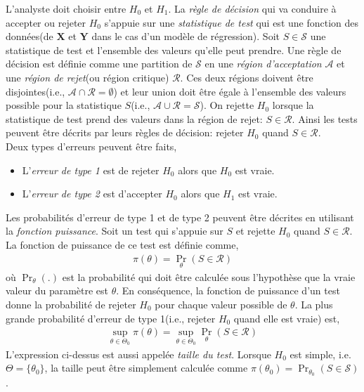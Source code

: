 L'analyste doit choisir entre $H_0$ et $H_1$.  La \emph{règle de décision} qui va conduire à accepter ou rejeter $H_0$ s'appuie sur une \emph{statistique de test} qui est une fonction des données(de $\mathbf{X}$ et $\mathbf{Y}$ dans le cas d'un modèle de régression). Soit $S\in \mathcal{S}$ une statistique de test et l'ensemble des valeurs qu'elle peut prendre. Une règle de décision est définie comme une partition de $\mathcal{S}$ en une \emph{région d'acceptation} $\mathcal{A}$ et une \emph{région de rejet}(ou région critique) $\mathcal{R}$. Ces deux régions doivent être disjointes(i.e., $\mathcal{A}\cap\mathcal{R} = \emptyset$) et leur union doit être égale à l'ensemble des valeurs possible pour la statistique $S$(i.e.,  $\mathcal{A}\cup\mathcal{R} = \mathcal{S}$). On rejette $H_0$ lorsque la statistique de test prend des valeurs dans la région de rejet: $S\in\mathcal{R}$. Ainsi les tests peuvent être décrits par leurs règles de décision: rejeter $H_0$ quand $S\in\mathcal{R}$.\\
Deux types d'erreurs peuvent être faits,
\begin{itemize}
\item L'\emph{erreur de type 1} est de rejeter $H_0$ alors que $H_0$ est vraie.
\item L'\emph{erreur de type 2} est d'accepter $H_0$ alors que $H_1$ est vraie.
\end{itemize}
Les probabilités d'erreur de type 1 et de type 2 peuvent être décrites en utilisant la \emph{fonction puissance}. Soit un test qui s'appuie sur $S$ et rejette $H_0$ quand $S\in\mathcal{R}$. La fonction de puissance de ce test est définie comme,
\begin{align*}
\pi(\theta) = \Pr_\theta(S\in \mathcal{R})
\end{align*}
où $\Pr_\theta(.)$ est la probabilité qui doit être calculée sous l'hypothèse que la vraie valeur du paramètre est $\theta$. En conséquence, la fonction de puissance d'un test donne la probabilité de rejeter $H_0$ pour chaque valeur possible de $\theta$. La plus grande probabilité d'erreur de type 1(i.e., rejeter $H_0$ quand elle est vraie) est,
\begin{align}
\underset{\theta \in \Theta_0}{\sup} \pi(\theta)=\underset{\theta \in \Theta_0}{\sup}\Pr_\theta(S\in \mathcal{R})
\label{eq47}
\end{align}
L'expression ci-dessus est aussi appelée \emph{taille du test}. Lorsque $H_0$ est simple, i.e. $\Theta = \{\theta_0\}$, la taille peut être simplement calculée comme $\pi(\theta_0) = \Pr_{\theta_0}(S\in\mathcal{S})$.\\
